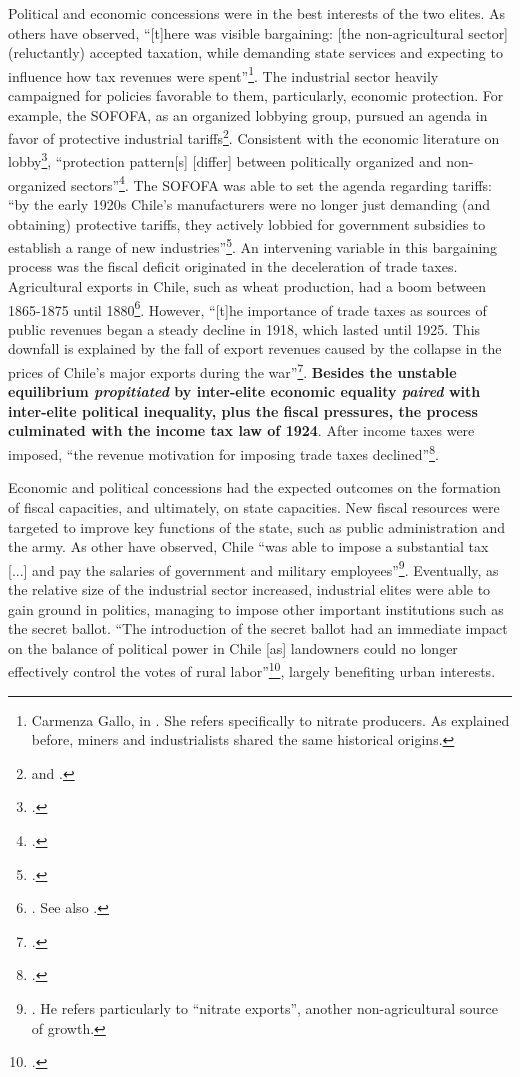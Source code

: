 \documentclass[onesided]{article}\usepackage[]{graphicx}\usepackage[]{color}
\begin{document}
Political and economic concessions were in the best interests of the two elites. As others have observed, ``[t]here was visible bargaining: [the non-agricultural sector] (reluctantly) accepted taxation, while demanding state services and expecting to influence how tax revenues were spent''\footnote{
	Carmenza Gallo, in \citet[p. 165]{Brautigam2008}. She refers specifically to nitrate producers. As explained before, miners and industrialists shared the same historical origins.
}. The industrial sector heavily campaigned for policies favorable to them, particularly, economic protection. For example, the SOFOFA, as an organized lobbying group, pursued an agenda in favor of  protective industrial  tariffs\footnote{\citet[p. 54]{Lederman2005} and \citet[p. 18]{Haber2005}.}. Consistent with the economic literature on lobby\footnote{\citet{Grossman1994a}.}, ``protection pattern[s] [differ] between politically organized and non-organized sectors''\footnote{\citet[p. 1136]{Goldberg1999}.}. The SOFOFA was able to set the agenda regarding tariffs: ``by the early 1920s Chile's manufacturers were no longer just demanding (and obtaining) protective tariffs, they actively lobbied for government subsidies to establish a range of new industries''\footnote{\citet[p. 18]{Haber2005}.}. An intervening variable in this bargaining process was the fiscal deficit originated in the deceleration of trade taxes. Agricultural exports in Chile, such as wheat production, had a boom between 1865-1875 until 1880\footnote{\citet[p. 68-69-70]{Bauer:2008kx}. See also \citet[p. 55]{Lederman2005}.}. However, ``[t]he importance of trade taxes as sources of public revenues began a steady decline in 1918, which lasted until 1925. This downfall is explained by the fall of export revenues caused by the collapse in the prices of Chile's major exports during the war''\footnote{\citet[p. 54-55]{Lederman2005}.}. {\bf Besides the unstable equilibrium \emph{propitiated} by inter-elite economic equality \emph{paired} with inter-elite political inequality, plus the fiscal pressures, the process culminated with the income tax law of 1924}. After income taxes were imposed, ``the revenue motivation for imposing trade taxes declined''\footnote{\citet[p. 55]{Lederman2005}.}. 

Economic and political concessions had the expected outcomes on the formation of fiscal capacities, and ultimately, on state capacities. New fiscal resources were targeted to improve key functions of the state, such as public administration and the army. As other have observed, Chile ``was able to impose a substantial tax [...] and pay the salaries of government and military employees''\footnote{\citet[p. 80]{Bauer:2008kx}. He refers particularly to ``nitrate exports'', another non-agricultural source of growth.
}. Eventually, as the relative size of the industrial sector increased, industrial elites were able to gain ground in politics, managing to impose other important institutions such as the secret ballot. ``The introduction of the secret ballot had an immediate impact on the balance of political power in Chile [as] landowners could no longer effectively control the votes of rural labor''\footnote{\citet[p. 1749]{Baland2008}.}, largely benefiting urban interests. 
\end{document}
